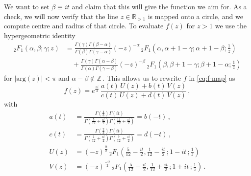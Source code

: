 \documentclass[11pt,a4paper]{article}
\numberwithin{equation}{section}
\begin{document}
\medskip

We want to set $\beta\equiv it$ and claim that this will give the function we aim for. As a check, we will now verify that the line $z \in \mathbb{R}_{>1}$ is mapped onto a circle, and we compute centre and radius of that circle. To evaluate $f(z)$ for $z>1$ we use the hypergeometric identity \cite[Eq.\,9.132\,(2)]{zwillinger2014table}
%
\begin{align}
_2F_1(\alpha,\beta;\gamma;z) &= \frac{\Gamma\left(\gamma\right)\Gamma\left(\beta-\alpha\right)}{\Gamma\left(\beta\right)\Gamma\left(\gamma-\alpha\right)} (-z)^{-\alpha}\, _2F_1\left(\alpha,\alpha+1-\gamma;\alpha+1-\beta;\frac{1}{z}\right) 
\nonumber \\
&\quad + \frac{\Gamma\left(\gamma\right)\Gamma\left(\alpha-\beta\right)}{\Gamma\left(\alpha\right)\Gamma\left(\gamma-\beta\right)} (-z)^{-\beta}\, _2F_1\left(\beta,\beta+1-\gamma;\beta+1-\alpha;\frac{1}{z}\right)
\label{eq:hypergeo_id1/z}
\end{align}
%
for $\vert\text{arg}(z)\vert<\pi$ and $\alpha-\beta \notin \mathbb{Z}$\,. 
This allows us to rewrite $f$ in \eqref{eq:f-map} as
%
\begin{equation}\label{eq:f-transformed}
    f(z) = e^{\frac{\pi i}{3}} \, \frac{a(t) \,U(z) + b(t)\, V(z)}{c(t) \,U(z) +d(t)\, V(z)}\,,
\end{equation}
%
with
%
\begin{align}
   a(t) &= \frac{\Gamma\left(\frac{4}{3}\right)\Gamma\left(i t\right)}{\Gamma\left(\frac{5}{12}+ \frac{it}{2}\right)\Gamma\left(\frac{11}{12}+\frac{i t}{2}\right)} = b(-t)\,,\nonumber \\
   c(t) &=  \frac{\Gamma\left(\frac{2}{3}\right)\Gamma\left(i t\right)}{\Gamma\left(\frac{1}{12}+ \frac{i t}{2}\right)\Gamma\left(\frac{7}{12}+\frac{i t}{2}\right)} = d(-t)\,,
   \nonumber\\
    U(z) &= (-z)^{\frac{it}{2}} \,_2F_1 \left(\frac{5}{12}-\frac{it}{2},\frac{1}{12}-\frac{it}{2}\,;1-it\,;\frac{1}{z}\right) \nonumber \\
    V(z) &= (-z)^{\frac{-it}{2}} \,_2F_1 \left(\frac{5}{12}+\frac{it}{2},\frac{1}{12}+\frac{it}{2}\,;1+it\,;\frac{1}{z}\right)\,.\label{eq:abcduv-abbr}
\end{align}
\end{document}
